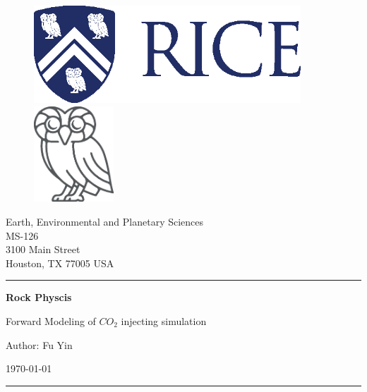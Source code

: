 
\begin{titlepage}

\begin{figure}[htbp]
    \centering
    \includegraphics[width=10cm]{figures/Rice_Logo_280_Blue.eps}
    \hfill
    \includegraphics[width=3cm]{figures/Rice_Owl_Flat_425_Gray.eps}
\end{figure}


\vspace{-0.5cm}
\begin{flushright}
    {\small Earth, Environmental and Planetary Sciences}\\
    {\small MS-126}\\
    {\small 3100 Main Street}\\
    {\small Houston, TX 77005 USA}
\end{flushright}
\hrule
\vspace{1cm}


{\LARGE\noindent \textbf{Rock Physcis} \par}
\vspace{0.3cm}
{\Large\noindent Forward Modeling of $CO_2$ injecting simulation \par}
\vspace{2cm}
{\LARGE\noindent Author: Fu Yin \par}
\vspace{0.5cm}
{\Large\noindent \today \par}
\vspace{7cm}
\hrule



\end{titlepage}
